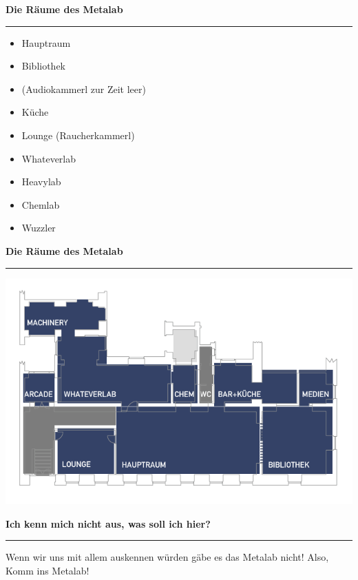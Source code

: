 \documentclass{seminar}
\providecommand{\T}[1]{
	\begin{center}
		{\bf #1}
	\end{center}
	\vspace{2mm}
	\hrule
	\vspace{2mm}
}
\begin{document}
\begin{slide}
	\T{Die Räume des Metalab}
	\begin{itemize}
		\item Hauptraum \pause
		\item Bibliothek \pause
		\item (Audiokammerl zur Zeit leer) \pause
		\item Küche \pause
		\item Lounge (Raucherkammerl) \pause
		\item Whateverlab \pause
		\item Heavylab \pause
		\item Chemlab \pause
		\item Wuzzler 
	\end{itemize}
\end{slide}

\begin{slide}
	\T{Die Räume des Metalab}
	\begin{center}
		\includegraphics[scale=0.4]{the_lab.png}
	\end{center}
\end{slide}

\begin{slide}
	\T{Ich kenn mich nicht aus, was soll ich hier?}
	\begin{center}
		Wenn wir uns mit allem auskennen würden gäbe es das Metalab nicht! \pause 
		Also, \\
		{\Huge Komm ins Metalab!}
	\end{center}
\end{slide}
\end{document}
